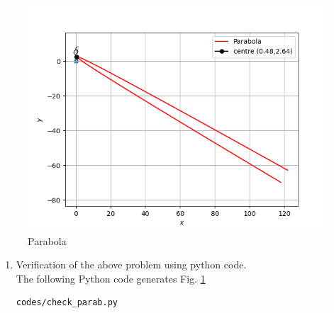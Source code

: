 \documentclass[journal,12pt,twocolumn]{IEEEtran}
\renewcommand\thesection{\arabic{section}}
\begin{document}
\begin{figure}[!ht]
\centering
\includegraphics[width=\columnwidth]{./figs/parabola.png}
\caption{Parabola}
\label{fig:parabola}
\end{figure}

\renewcommand{\theequation}{\theenumi}
\begin{enumerate}[label=\thesection.\arabic*.,ref=\thesection.\theenumi]
\item Verification of the above problem using python code.\\
\solution The  following Python code generates Fig. \ref{fig:parabola}
\begin{lstlisting}
codes/check_parab.py
\end{lstlisting}
%
\end{enumerate}
\end{document}
